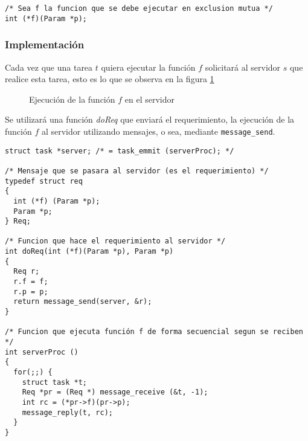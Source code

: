 \begin{lstlisting}
/* Sea f la funcion que se debe ejecutar en exclusion mutua */
int (*f)(Param *p);
\end{lstlisting}

\subsubsection{Implementación}

Cada vez que una tarea $t$ quiera ejecutar la función $f$ solicitará al servidor
$s$ que realice esta tarea, esto es lo que se observa en la figura
\ref{fig:mensajes_servicio}

\begin{figure}[htbp]
	\centering
	\caption{Ejecución de la función $f$ en el servidor}
	\label{fig:mensajes_servicio}
\end{figure}

Se utilizará una función \emph{doReq} que enviará el requerimiento, la
ejecución de la función $f$ al servidor utilizando mensajes, o sea, mediante
\texttt{message\_send}.

\begin{lstlisting}
struct task *server; /* = task_emmit (serverProc); */

/* Mensaje que se pasara al servidor (es el requerimiento) */
typedef struct req
{
  int (*f) (Param *p);
  Param *p;
} Req;

/* Funcion que hace el requerimiento al servidor */
int doReq(int (*f)(Param *p), Param *p)
{
  Req r;
  r.f = f;
  r.p = p;
  return message_send(server, &r);
}

/* Funcion que ejecuta función f de forma secuencial segun se reciben */
int serverProc ()
{
  for(;;) {
    struct task *t;
    Req *pr = (Req *) message_receive (&t, -1);
    int rc = (*pr->f)(pr->p);
    message_reply(t, rc);
  }
}
\end{lstlisting}


